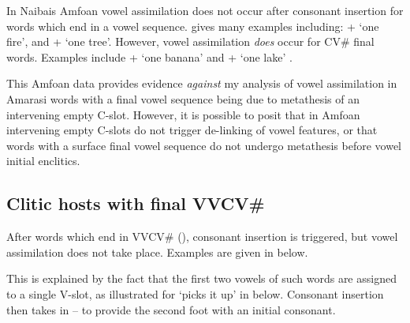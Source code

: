 In Nai{\Q}bais Amfo{\Q}an vowel assimilation does not occur
after consonant insertion for words which end in a vowel sequence.
\citet[32]{cu18} gives many examples including:
 +  {\ra}  `one fire',
and  +  {\ra}  `one tree'.
However, vowel assimilation \emph{does} occur for CV{\#} final words.
Examples include  +  {\ra}  `one banana'
and  +  {\ra}  `one lake' \citep[32]{cu18}.

This Amfo{\Q}an data provides evidence
\emph{against} my analysis of vowel assimilation in Amarasi
words with a final vowel sequence being due to
metathesis of an intervening empty C-slot.
However, it is possible to posit that in Amfo{\Q}an
intervening empty C-slots do not trigger de-linking
of vowel features, or that words with a surface
final vowel sequence do not undergo metathesis
before vowel initial enclitics.

\subsection{Clitic hosts with final VVCV{\#}}
After words which end in VVCV{\#} (),
consonant insertion is triggered, but vowel assimilation does not take place.
Examples are given in  below.

\begin{exe}
	\label{ex2:V1V2C1V3a->V1V2C1Ca=}
\end{exe}

This is explained by the fact that the first two vowels
of such words are assigned to a single V-slot, as illustrated
for  {\ra}  `picks it up' in  below.
Consonant insertion then takes in --
to provide the second foot with an initial consonant.

